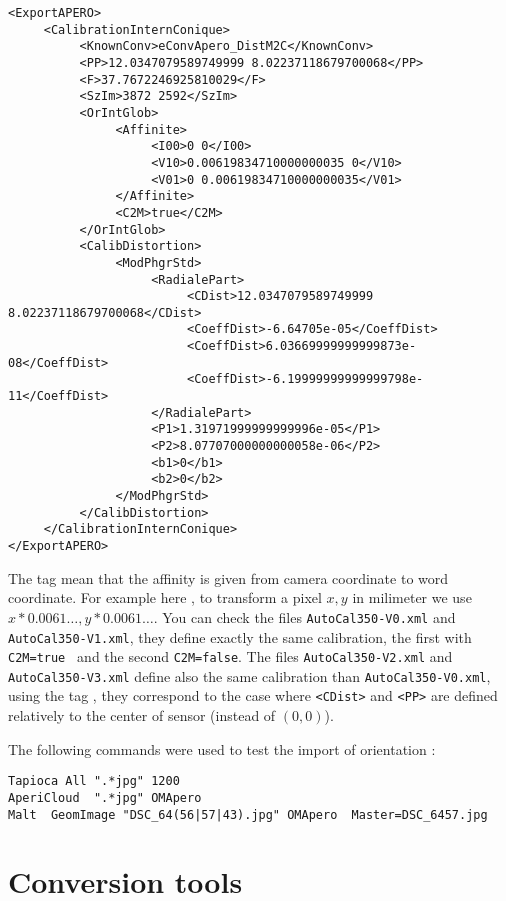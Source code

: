 \begin{verbatim}
<ExportAPERO>
     <CalibrationInternConique>
          <KnownConv>eConvApero_DistM2C</KnownConv>
          <PP>12.0347079589749999 8.02237118679700068</PP>
          <F>37.7672246925810029</F>
          <SzIm>3872 2592</SzIm>
          <OrIntGlob>
               <Affinite>
                    <I00>0 0</I00>
                    <V10>0.00619834710000000035 0</V10>
                    <V01>0 0.00619834710000000035</V01>
               </Affinite>
               <C2M>true</C2M>
          </OrIntGlob>
          <CalibDistortion>
               <ModPhgrStd>
                    <RadialePart>
                         <CDist>12.0347079589749999 8.02237118679700068</CDist>
                         <CoeffDist>-6.64705e-05</CoeffDist>
                         <CoeffDist>6.03669999999999873e-08</CoeffDist>
                         <CoeffDist>-6.19999999999999798e-11</CoeffDist>
                    </RadialePart>
                    <P1>1.31971999999999996e-05</P1>
                    <P2>8.07707000000000058e-06</P2>
                    <b1>0</b1>
                    <b2>0</b2>
               </ModPhgrStd>
          </CalibDistortion>
     </CalibrationInternConique>
</ExportAPERO>
\end{verbatim}


The tag {\tt <C2M>} mean that the affinity is given from camera coordinate to word coordinate.
For example here , to transform a pixel $x,y$ in milimeter we use $x*0.0061\dots,y*0.0061\dots$.
You can check the files {\tt AutoCal350-V0.xml} and {\tt AutoCal350-V1.xml},
they define exactly the same calibration, the first with {\tt C2M=true } and the second {\tt C2M=false}.
The files {\tt AutoCal350-V2.xml} and {\tt AutoCal350-V3.xml} define also the same
calibration than  {\tt AutoCal350-V0.xml}, using the tag {\tt <I00>}, they correspond to the case
where  {\tt  <CDist>} and {\tt <PP>} are defined relatively to the center of sensor (instead of $(0,0)$).


The following commands were used to test the import of orientation :

\begin{verbatim}
Tapioca All ".*jpg" 1200
AperiCloud  ".*jpg" OMApero
Malt  GeomImage "DSC_64(56|57|43).jpg" OMApero  Master=DSC_6457.jpg
\end{verbatim}

\section{Conversion tools}

